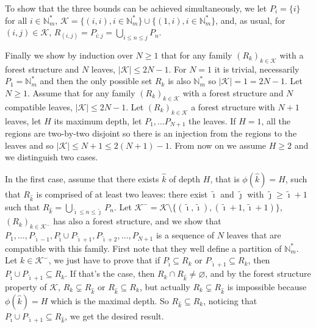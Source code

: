 \documentclass[
  11pt,
  a4paper,
]{article}
\theoremstyle{definition}
\theoremstyle{plain}
\theoremstyle{plain}
\theoremstyle{plain}
\theoremstyle{definition}
\theoremstyle{remark}
\begin{document}
To show that the three bounds can be achieved simultaneously, we let
\(P_i=\{i\}\) for all \(i\in\mathbb{N}_m^*\),
\(\mathcal{K}=\{(i,i), i\in\mathbb{N}_m^*\}\cup\{(1,i), i\in\mathbb{N}_m^*\}\),
and, as usual, for \((i,j)\in\mathcal{K}\),
\(R_{(i,j)}=P_{i:j}=\bigcup_{i\leq n\leq j}P_n\).

Finally we show by induction over \(N\geq1\) that for any family
\((R_k)_{k\in\mathcal{K}}\) with a forest structure and \(N\) leaves,
\(|\mathcal{K}|\leq 2N-1\). For \(N=1\) it is trivial, necessarily
\(P_1=\mathbb{N}_m^*\) and then the only possible set \(R_k\) is also
\(\mathbb{N}_m^*\) so \(|\mathcal{K}|=1=2N-1\). Let \(N\geq 1\). Assume
that for any family \((R_k)_{k\in\mathcal{K}}\) with a forest structure
and \(N\) compatible leaves, \(|\mathcal{K}|\leq 2N-1\). Let
\((R_k)_{k\in\mathcal{K}}\) a forest structure with \(N+1\) leaves, let
\(H\) its maximum depth, let \(P_1, \dotsc P_{N+1}\) the leaves. If
\(H=1\), all the regions are two-by-two disjoint so there is an
injection from the regions to the leaves and so
\(|\mathcal{K}|\leq N+1\leq 2(N+1)-1\). From now on we assume \(H\geq2\)
and we distinguish two cases.

In the first case, assume that there exists \(\hat k\) of depth \(H\),
that is \(\phi(\hat k)=H\), such that \(R_{\hat k}\) is comprised of at
least two leaves: there exist \(\tilde\imath\) and \(\tilde\jmath\) with
\(\tilde\jmath\geq\tilde\imath+1\) such that
\(R_{\hat k}=\bigcup_{\tilde\imath\leq n\leq \tilde\jmath}P_n\). Let
\(\mathcal{K}^-=\mathcal{K}\setminus\{(\tilde\imath, \tilde\imath), (\tilde\imath+1, \tilde\imath+1)\}\),
\((R_k)_{k\in\mathcal{K}^-}\) has also a forest structure, and we show
that
\(P_1,\dotsc,P_{\tilde\imath-1}, P_{\tilde\imath}\cup P_{\tilde\imath+1},P_{\tilde\imath+2},\dotsc,P_{N+1}\)
is a sequence of \(N\) leaves that are compatible with this family.
First note that they well define a partition of \(\mathbb{N}_m^*\). Let
\(k\in\mathcal{K}^-\), we just have to prove that if
\(P_{\tilde\imath}\subseteq R_k\) or
\(P_{\tilde\imath+1}\subseteq R_k\), then
\(P_{\tilde\imath}\cup P_{\tilde\imath+1}\subseteq R_k\). If that's the
case, then \(R_k\cap R_{\hat k}\neq\varnothing\), and by the forest
structure property of \(\mathcal{K}\), \(R_k\subsetneq R_{\hat k}\) or
\(R_{\hat k}\subseteq R_k\), but actually \(R_k\subsetneq R_{\hat k}\)
is impossible because \(\phi(\hat k)=H\) which is the maximal depth. So
\(R_{\hat k}\subseteq R_k\), noticing that
\(P_{\tilde\imath}\cup P_{\tilde\imath+1}\subseteq R_{\hat k}\), we get
the desired result.
\end{document}
